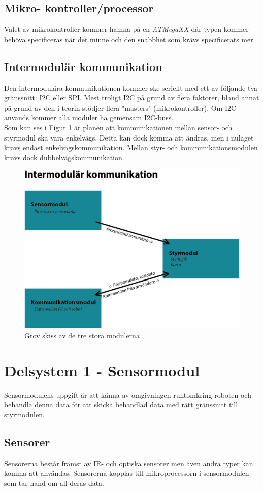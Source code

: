 \documentclass[11pt]{article}
\begin{document}
\begin{flushleft}
\subsection{Mikro- kontroller/processor}
Valet av mikrokontroller kommer hamna på en \textit{ATMegaXX} där typen kommer behöva specificeras när det minne och den snabbhet som krävs specificerats mer.


\subsection{Intermodulär kommunikation}
Den intermodulära kommunikationen kommer ske seriellt med ett av följande två gränssnitt: I2C eller SPI. Mest troligt I2C på grund av flera faktorer, bland annat på grund av den i teorin stödjer flera "masters" (mikrokontroller). Om I2C används kommer alla moduler ha gemensam I2C-buss. \\
\bigskip
Som kan ses i Figur \ref{fig:Intermodulär_Komm} är planen att kommunikationen mellan sensor- och styrmodul ska vara enkelvägs. Detta kan dock komma att ändras, men i nuläget krävs endast enkelvägskommunikation. Mellan styr- och kommunikationsmodulen krävs dock dubbelvägskommunikation.




\begin{figure}[H]
\centering
\includegraphics[width=0.5\linewidth]{../Images/Intermodular_Komm}
\caption{Grov skiss av de tre stora modulerna}
\label{fig:Intermodulär_Komm}
\end{figure}



\section{Delsystem 1 - Sensormodul}
Sensormodulens uppgift är att känna av omgivningen runtomkring roboten och behandla denna data för att skicka behandlad data med rätt gränssnitt till styrmodulen.


\subsection{Sensorer}
Sensorerna består främst av IR- och optiska sensorer men även andra typer kan komma att användas. Sensorerna kopplas till mikroprocessorn i sensormodulen som tar hand om all deras data.


\end{flushleft}
\end{document}
